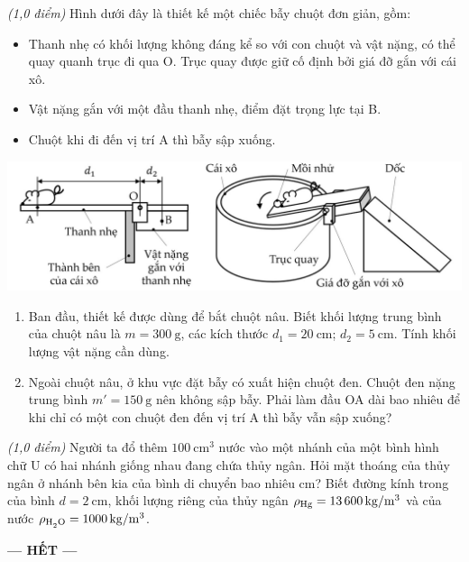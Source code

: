 \begin{ex}\textit{(1,0 điểm)} 
	Hình dưới đây là thiết kế một chiếc bẫy chuột đơn giản, gồm:
	\begin{itemize}
		\item Thanh nhẹ có khối lượng không đáng kể so với con chuột và vật nặng, có thể quay quanh trục đi qua O. Trục quay được giữ cố định bởi giá đỡ gắn với cái xô.
		\item Vật nặng gắn với một đầu thanh nhẹ, điểm đặt trọng lực tại B.
		\item Chuột khi đi đến vị trí A thì bẫy sập xuống.
	\end{itemize}
	\begin{center}
		\includegraphics[scale=0.5]{../figs/D10-KTTX3-001-3}
	\end{center}
	\begin{enumerate}[label=\alph*)]
		\item Ban đầu, thiết kế được dùng để bắt chuột nâu. Biết khối lượng trung bình của chuột nâu là $m=\SI{300}{\gram}$, các kích thước $d_1=\SI{20}{\centi\meter}$; $d_2=\SI{5}{\centi\meter}$. Tính khối lượng vật nặng cần dùng.
		\item 	Ngoài chuột nâu, ở khu vực đặt bẫy có xuất hiện chuột đen. Chuột đen nặng trung bình $m'=\SI{150}{\gram}$ nên không sập bẫy. Phải làm đầu OA dài bao nhiêu để khi chỉ có một con chuột đen đến vị trí A thì bẫy vẫn sập xuống?
	\end{enumerate}
	\loigiai{}
\end{ex}
\begin{ex}\textit{(1,0 điểm)}
	Người ta đổ thêm $\SI{100}{\centi\meter^3}$ nước vào một nhánh của một bình hình chữ U có hai nhánh giống nhau đang chứa thủy ngân. Hỏi mặt thoáng của thủy ngân ở nhánh bên kia của bình di chuyển bao nhiêu $\si{\centi\meter}$? Biết đường kính trong của bình $d=\SI{2}{\centi\meter}$, khối lượng riêng của thủy ngân $\rho_{\ce{Hg}}=\SI{13600}{\kilogram/\meter^3}$ và của nước $\rho_{\ce{H_2O}}=\SI{1000}{\kilogram/\meter^3}$.
\end{ex}
\begin{center}
	\textbf{--- HẾT ---}
\end{center}